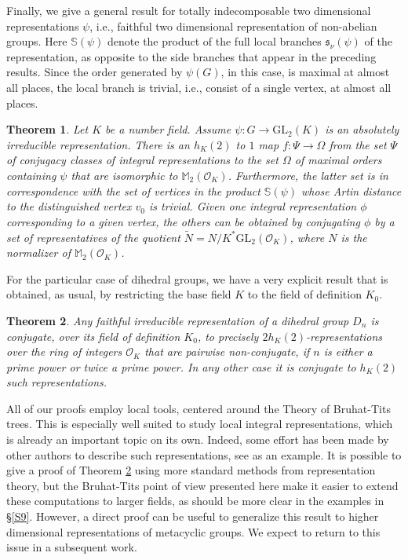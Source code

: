 \documentclass{article}
\newtheorem{Thm}{Theorem}
\theoremstyle{definition}
\theoremstyle{remark}
\begin{document}
Finally, we give a general result for totally 
indecomposable two dimensional representations $\psi$, 
i.e., faithful two dimensional representation of 
non-abelian groups. Here $\mathbb{S}(\psi)$
denote the product of the full local branches
$\mathfrak{s}_\nu(\psi)$ of
the representation, as opposite to the side
branches that appear in the preceding results.
Since the order generated by $\psi(G)$, in this case,
is maximal at almost all places, the local branch
is trivial, i.e., consist of a single vertex,
at almost all places. 

\begin{Thm}\label{t7}
Let $K$ be a number field.
Assume $\psi:G\rightarrow\mathrm{GL}_2(K)$ is an absolutely 
irreducible representation.
There is an $h_K(2)$ to $1$ map $f:\Psi\rightarrow\Omega$
from the set $\Psi$ of conjugacy classes of integral 
representations to the set $\Omega$ of maximal orders
containing $\psi$ that are isomorphic to 
$\mathbb{M}_2(\mathcal{O}_K)$.
Furthermore, the latter set is in correspondence
with the set of vertices in the product $\mathbb{S}(\psi)$ 
whose Artin distance to the distinguished vertex $v_0$ 
is trivial. Given one integral representation $\phi$ corresponding 
to a given vertex, the others can be obtained by conjugating
$\phi$ by a set of representatives of the quotient 
$\tilde{N}=N/K^*\mathrm{GL}_2(\mathcal{O}_K)$,
where $N$ is the normalizer of $\mathbb{M}_2(\mathcal{O}_K)$.
\end{Thm}


For the particular case of
dihedral groups, we have a very explicit result that
is obtained, as usual, by restricting the base field $K$
to the field of definition $K_0$.


\begin{Thm}\label{t4}
    Any faithful irreducible representation of a 
    dihedral group $D_n$ is 
    conjugate, over its field of definition $K_0$, 
    to precisely  
    $2h_K(2)$-representations over the ring of 
    integers $\mathcal{O}_K$
    that are pairwise non-conjugate, if $n$ is either 
    a prime power or
    twice a prime power. In any other case it is 
    conjugate to $h_K(2)$
    such representations.
\end{Thm}

All of our proofs employ local tools, 
centered around the Theory of Bruhat-Tits 
trees. This is especially well suited to study local integral 
representations, which is already an important topic on its own.
Indeed, some effort has been made by other authors to
describe such representations, see \cite{Man99} as an example. 
It is possible to give a 
proof of Theorem \ref{t4} using more standard methods from
representation theory, but the Bruhat-Tits point of view 
presented here make it easier to extend these computations
to larger fields, as should be more clear in the examples in \S\ref{S9}.
However, a direct proof can be useful to generalize this result
to higher dimensional representations of metacyclic groups.
We expect to return to this issue in a subsequent work.
\end{document}

